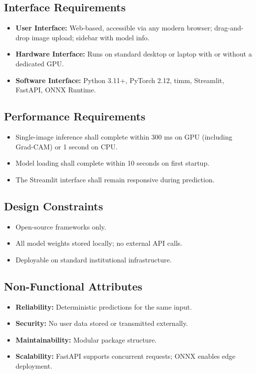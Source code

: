 \documentclass[12pt,a4paper,oneside]{report}
\begin{document}
\subsection{Interface Requirements}

\begin{itemize}[leftmargin=*]
  \item \textbf{User Interface:} Web-based, accessible via any modern browser; drag-and-drop image upload; sidebar with model info.
  \item \textbf{Hardware Interface:} Runs on standard desktop or laptop with or without a dedicated GPU.
  \item \textbf{Software Interface:} Python 3.11+, PyTorch 2.12, timm, Streamlit, FastAPI, ONNX Runtime.
\end{itemize}

\subsection{Performance Requirements}

\begin{itemize}[leftmargin=*]
  \item Single-image inference shall complete within 300 ms on GPU (including Grad-CAM) or 1 second on CPU.
  \item Model loading shall complete within 10 seconds on first startup.
  \item The Streamlit interface shall remain responsive during prediction.
\end{itemize}

\subsection{Design Constraints}

\begin{itemize}[leftmargin=*]
  \item Open-source frameworks only.
  \item All model weights stored locally; no external API calls.
  \item Deployable on standard institutional infrastructure.
\end{itemize}

\subsection{Non-Functional Attributes}

\begin{itemize}[leftmargin=*]
  \item \textbf{Reliability:} Deterministic predictions for the same input.
  \item \textbf{Security:} No user data stored or transmitted externally.
  \item \textbf{Maintainability:} Modular package structure.
  \item \textbf{Scalability:} FastAPI supports concurrent requests; ONNX enables edge deployment.
\end{itemize}
\end{document}
